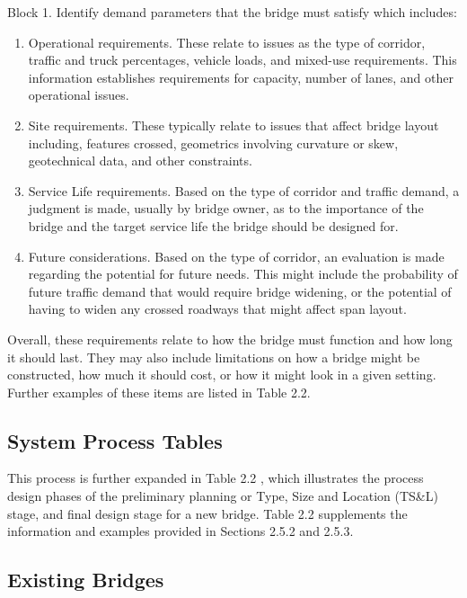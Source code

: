 Block 1. Identify demand parameters that the bridge must satisfy which includes:
\begin{enumerate}
  \item Operational requirements. These relate to issues as the type of corridor, traffic and truck percentages,
  vehicle loads, and mixed-use requirements. This information establishes requirements for capacity,
  number of lanes, and other operational issues.
  \item Site requirements. These typically relate to issues that affect bridge layout including, features crossed,
  geometrics involving curvature or skew, geotechnical data, and other constraints.
  \item Service Life requirements. Based on the type of corridor and traffic demand, a judgment is made,
  usually by bridge owner, as to the importance of the bridge and the target service life the bridge should
  be designed for.
  \item Future considerations. Based on the type of corridor, an evaluation is made regarding the potential for
  future needs. This might include the probability of future traffic demand that would require bridge
  widening, or the potential of having to widen any crossed roadways that might affect span layout.
\end{enumerate}

Overall, these requirements relate to how the bridge must function and how long it should last. They may also
include limitations on how a bridge might be constructed, how much it should cost, or how it might look in a
given setting. Further examples of these items are listed in Table 2.2.



\subsection{System Process Tables}

This process is further expanded in Table 2.2 , which illustrates the process design phases of the preliminary
planning or Type, Size and Location (TS\&L) stage, and final design stage for a new bridge. Table 2.2 supplements
the information and examples provided in Sections 2.5.2 and 2.5.3.

\subsection{Existing Bridges}

